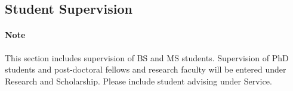 \documentclass[11pt]{article}
\begin{document}

\subsection{Student Supervision}
\paragraph{Note} This section includes supervision of BS and MS students.  Supervision of PhD students and post-doctoral fellows and research faculty will be entered under Research and Scholarship.   Please include student advising under Service.
\end{document}
